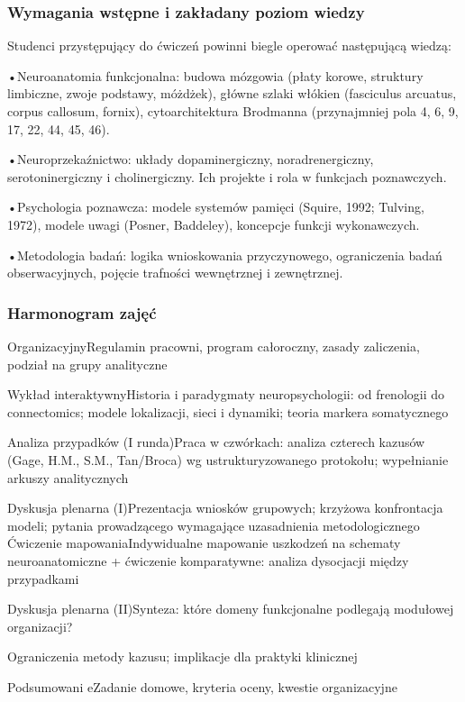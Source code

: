 \documentclass[11pt,a4paper]{article}
\begin{document}
\subsubsection{Wymagania wstępne i zakładany poziom wiedzy}

Studenci przystępujący do ćwiczeń powinni biegle operować następującą wiedzą:

•Neuroanatomia funkcjonalna: budowa mózgowia (płaty korowe, struktury limbiczne, zwoje
podstawy, móżdżek), główne szlaki włókien (fasciculus arcuatus, corpus callosum, fornix),
cytoarchitektura Brodmanna (przynajmniej pola 4, 6, 9, 17, 22, 44, 45, 46).

•Neuroprzekaźnictwo: układy dopaminergiczny, noradrenergiczny, serotoninergiczny i cholinergiczny.
Ich projekte i rola w funkcjach poznawczych.

•Psychologia poznawcza: modele systemów pamięci (Squire, 1992; Tulving, 1972), modele uwagi
(Posner, Baddeley), koncepcje funkcji wykonawczych.

•Metodologia badań: logika wnioskowania przyczynowego, ograniczenia badań obserwacyjnych,
pojęcie trafności wewnętrznej i zewnętrznej.

\subsubsection{Harmonogram zajęć}

OrganizacyjnyRegulamin pracowni, program całoroczny, zasady zaliczenia, podział na
grupy analityczne

Wykład interaktywnyHistoria i paradygmaty neuropsychologii: od frenologii do connectomics;
modele lokalizacji, sieci i dynamiki; teoria markera somatycznego

Analiza przypadków
(I runda)Praca w czwórkach: analiza czterech kazusów (Gage, H.M., S.M.,
Tan/Broca) wg ustrukturyzowanego protokołu; wypełnianie arkuszy
analitycznych

Dyskusja plenarna (I)Prezentacja wniosków grupowych; krzyżowa konfrontacja modeli; pytania
prowadzącego wymagające uzasadnienia metodologicznego
Ćwiczenie
mapowaniaIndywidualne mapowanie uszkodzeń na schematy neuroanatomiczne + ćwiczenie komparatywne: analiza dysocjacji między przypadkami

Dyskusja plenarna
(II)Synteza: które domeny funkcjonalne podlegają modułowej organizacji? 

Ograniczenia metody kazusu; implikacje dla praktyki klinicznej

Podsumowani
eZadanie domowe, kryteria oceny, kwestie organizacyjne
\end{document}

